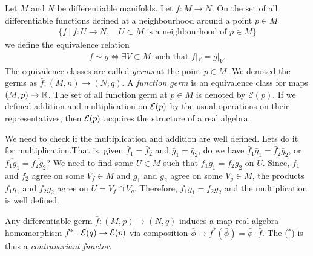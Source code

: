 Let $M$ and $N$ be differentiable manifolds. Let $f: M\to N$. On the set of all differentiable functions defined at a neighbourhood around a point $p\in M$
\begin{align}
    \{f\ |\ f: U\to N, \quad U\subset M \text{ is a neighbourhood of $p\in M$}\}
\end{align}
we define the equivalence relation
\begin{align}
    f \sim g \iff \exists V\subset M \text{ such that } f|_V = g|_V.
\end{align}
The equivalence classes are called \emph{germs} at the point $p\in M$. We denoted the germs as $\bar f: (M,n)\to (N,q)$. A \emph{function germ} is an equivalence class for maps $(M,p)\to \mathbb{R}$. The set of all function germ at $p\in M$ is denoted by $\mathcal E(p)$. If we defined addition and multiplication on $\mathcal E(p)$ by the usual operations on their representatives, then $\mathcal E (p)$ acquires the structure of a real algebra.
\begin{insight}
    We need to check if the multiplication and addition are well defined. Lets do it for multiplication.That is, given $\bar f_1 = \bar f_2$ and $\bar g_1 = \bar g_2$, do we have $\bar f_1 \bar g_1 = \bar f_2 \bar g_2$, or $\overline{f_1 g_1}=\overline{f_2 g_2}$? We need to find some $U\in M$ such that $f_1g_1=f_2g_2$ on $U$. Since, $f_1$ and $f_2$ agree on some $V_f\in M$ and $g_1$ and $g_2$ agree on some $V_g\in M$, the products $f_1 g_1$ and $f_2 g_2$ agree on $U=V_f\cap V_g$. Therefore, $\overline{f_1 g_1} = \overline{f_2 g_2}$ and the multiplication is well defined. 
\end{insight}

Any differentiable germ $\bar f: (M,p)\to (N,q)$ induces a map real algebra homomorphism $f^*: \mathcal E(q)\to\mathcal E(p)$ via composition $\bar\phi \mapsto f^*(\bar\phi)=\bar\phi\cdot \bar f$. The ($^*$) is thus a \emph{contravariant functor}.

\begin{center}
\end{center}

